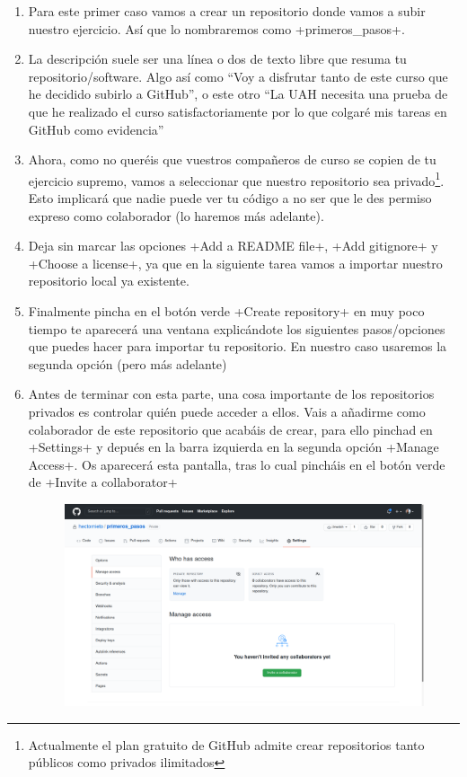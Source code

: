 \documentclass[a5paper,10pt]{article}
\begin{document}
\begin{enumerate}
       \item Para este primer caso vamos a crear un repositorio donde vamos a subir nuestro ejercicio. Así que lo nombraremos como \cverb+primeros_pasos+.
       
       \item La descripción suele ser una línea o dos de texto libre que resuma tu repositorio/software. Algo así como ``Voy a disfrutar tanto de este curso que he decidido subirlo a GitHub'', o este otro ``La UAH necesita una prueba de que he realizado el curso satisfactoriamente por lo que colgaré mis tareas en GitHub como evidencia''
       
       \item Ahora, como no queréis que vuestros compañeros de curso se copien de tu ejercicio supremo, vamos a seleccionar que nuestro repositorio sea privado\footnote{Actualmente el plan gratuito de GitHub admite crear repositorios tanto públicos como privados ilimitados}. Esto implicará que nadie puede ver tu código a no ser que le des permiso expreso como colaborador (lo haremos más adelante).
       
       \item Deja sin marcar las opciones \cverb+Add a README file+, \cverb+Add gitignore+ y \cverb+Choose a license+, ya que en la siguiente tarea vamos a importar nuestro repositorio local ya existente.
       
       \item Finalmente pincha en el botón verde \cverb+Create repository+ en muy poco tiempo te aparecerá una ventana explicándote los siguientes pasos/opciones que puedes hacer para importar tu repositorio. En nuestro caso usaremos la segunda opción (pero más adelante)
       
       \item Antes de terminar con esta parte, una cosa importante de los repositorios privados es controlar quién puede acceder a ellos. Vais a añadirme como colaborador de este repositorio que acabáis de crear, para ello pinchad en \cverb+Settings+ y depués en la barra izquierda en la segunda opción \cverb+Manage Access+. Os aparecerá esta pantalla, tras lo cual pincháis en el botón verde de \cverb+Invite a collaborator+

       \begin{figure}[H]\centering
        \hspace{-1cm}\includegraphics[width=1.2\columnwidth]{github_add_collaborator}
       \end{figure}
       

\end{enumerate}
\end{document}
